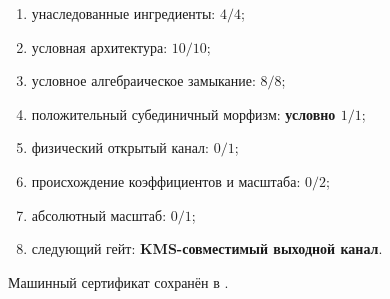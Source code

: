 \begin{protocol}\begin{enumerate}
\item унаследованные ингредиенты: \textbf{$4/4$};
\item условная архитектура: \textbf{$10/10$};
\item условное алгебраическое замыкание: \textbf{$8/8$};
\item положительный субединичный морфизм: \textbf{условно $1/1$};
\item физический открытый канал: \textbf{$0/1$};
\item происхождение коэффициентов и масштаба: \textbf{$0/2$};
\item абсолютный масштаб: \textbf{$0/1$};
\item следующий гейт: \textbf{KMS-совместимый выходной канал}.
\end{enumerate}\end{protocol}

Машинный сертификат сохранён в
.
